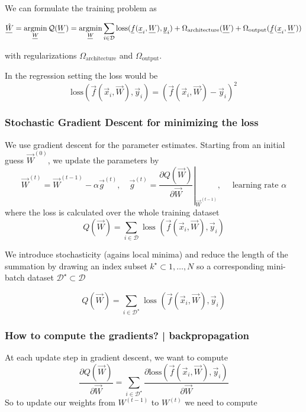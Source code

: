 We can formulate the training problem as

\begin{equation}
    \vec{\hat{W}} = \argmin_{\vec{W}} \mathcal{Q}(\vec{W}) = \argmin_{\vec{W}} \sum_{i\in \mathcal{D}} \text{loss}(\vec{f}(\vec{x}_i, \vec{W}), \vec{y}_i) + \Omega_\text{architecture}(\vec{W}) + \Omega_\text{output}(\vec{f}(\vec{x}_i, \vec{W}))
\end{equation}

with regularizations $\Omega_\text{architecture}$ and $\Omega_\text{output}$.

In the regression setting the loss would be
\begin{equation}
    \text{loss}(\vec{f}(\vec{x}_i, \vec{W}), \vec{y}_i) = \left(\vec{f}(\vec{x}_i, \vec{W}) - \vec{y}_i \right)^2
\end{equation}

\subsubsection{Stochastic Gradient Descent for minimizing the loss}
We use gradient descent for the parameter estimates.
Starting from an initial guess $\vec{W}^{(0)}$, we update the parameters by
\begin{equation}
    \vec{W}^{(t)}=\vec{W}^{(t-1)}-\alpha \vec{g}^{(t)}, \quad \vec{g}^{(t)}=\left.\frac{\partial Q(\vec{W})}{\partial \vec{W}}\right|_{\vec{W}^{(t-1)}}, \quad \text { learning rate } \alpha
\end{equation}
where the loss is calculated over the whole training dataset
\begin{equation}
    Q(\vec{W})=\sum_{i \in \mathcal{D}} \text { loss }\left(\vec{f}\left(\vec{x}_{i}, \vec{W}\right), \vec{y}_{i}\right)
\end{equation}

We introduce stochasticity (agains local minima) and reduce the length of the summation
by drawing an index subset $k^\star \subset 1, \ldots, N$ so a corresponding mini-batch
dataset $\mathcal{D}^\star \subset \mathcal{D}$

\begin{equation}
    Q(\vec{W})=\sum_{i \in \mathcal{D}^\star} \text { loss }\left(\vec{f}\left(\vec{x}_{i}, \vec{W}\right), \vec{y}_{i}\right)
\end{equation}

\subsubsection{How to compute the gradients? | backpropagation}
At each update step in gradient descent, we want to compute
\begin{equation}
    \frac{\partial Q(\vec{W})}{\partial \vec{W}} = \sum_{i \in \mathcal{D}^\star} \frac{\partial \text{loss}\left(\vec{f}\left(\vec{x}_{i}, \vec{W}\right), \vec{y}_{i}\right)}{\partial \vec{W}}
\end{equation}
So to update our weights from $W^{(t-1)}$ to $W^{(t)}$ we need to compute

